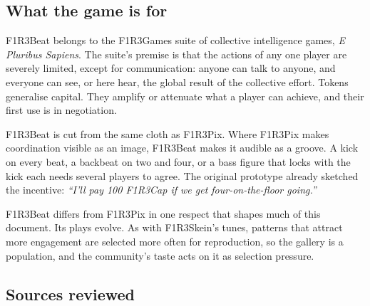 \documentclass[11pt,a4paper]{article}
\begin{document}
\subsection{What the game is for}

F1R3Beat belongs to the F1R3Games suite of collective intelligence games, \emph{E Pluribus
Sapiens}. The suite's premise is that the actions of any one player are severely limited,
except for communication: anyone can talk to anyone, and everyone can see, or here hear, the
global result of the collective effort. Tokens generalise capital. They amplify or attenuate
what a player can achieve, and their first use is in negotiation.

F1R3Beat is cut from the same cloth as F1R3Pix. Where F1R3Pix makes coordination visible as
an image, F1R3Beat makes it audible as a groove. A kick on every beat, a backbeat on two and
four, or a bass figure that locks with the kick each needs several players to agree. The
original prototype already sketched the incentive: \emph{``I'll pay 100 F1R3Cap if we get
four-on-the-floor going.''}

F1R3Beat differs from F1R3Pix in one respect that shapes much of this document. Its plays
evolve. As with F1R3Skein's tunes, patterns that attract more engagement are selected more
often for reproduction, so the gallery is a population, and the community's taste acts on it
as selection pressure.

\subsection{Sources reviewed}
\end{document}
